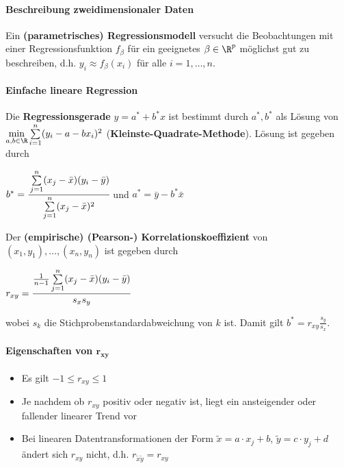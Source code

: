 \paragraph{Beschreibung zweidimensionaler Daten}
Ein \textbf{(parametrisches) Regressionsmodell} versucht die Beobachtungen mit einer Regressionsfunktion $f_\beta$ für ein geeignetes $\beta\in\R^p$ möglichst gut zu beschreiben, d.h. $y_i\approx f_\beta(x_i)$ für alle $i=1,\ldots,n$.

\paragraph{Einfache lineare Regression}
Die \textbf{Regressionsgerade} $y=a^*+b^*x$ ist bestimmt durch $a^*,b^*$ als Lösung von\\
$\min\limits_{a,b\in\R}\sum\limits_{i=1}^{n}(y_i-a-bx_i)^2$ (\textbf{Kleinste-Quadrate-Methode}).
Lösung ist gegeben durch
\begin{tightcenter}
	$b^*=\cfrac{\sum\limits_{j=1}^{n}(x_j-\bar{x})(y_i-\bar{y})}{\sum\limits_{j=1}^{n}(x_j-\bar{x})^2}$ \qquad und\qquad
	$a^*=\bar{y}-b^*\bar{x}$
\end{tightcenter}
Der \textbf{(empirische) (Pearson-) Korrelationskoeffizient} von $(x_1,y_1),\ldots,(x_n,y_n)$ ist gegeben durch
\begin{tightcenter}
	$r_{xy}=\cfrac{\frac{1}{n-1}\sum\limits_{j=1}^{n}(x_j-\bar{x})(y_i-\bar{y})}{s_xs_y}$
\end{tightcenter}
wobei $s_k$ die Stichprobenstandardabweichung von $k$ ist.
Damit gilt $b^*=r_{xy}\frac{s_y}{s_x}$.

\paragraph{Eigenschaften von $\boldsymbol{r_{xy}}$}
\begin{itemize}
	\item Es gilt $-1\leq r_{xy}\leq 1$
	\item Je nachdem ob $r_{xy}$ positiv oder negativ ist, liegt ein ansteigender oder fallender linearer Trend vor
	\item Bei linearen Datentransformationen der Form $\tilde{x}=a\cdot x_j+b$, $\tilde{y}=c\cdot y_j+d$ ändert sich $r_{xy}$ nicht, d.h. $r_{\tilde{x}\tilde{y}}=r_{xy}$
\end{itemize}
